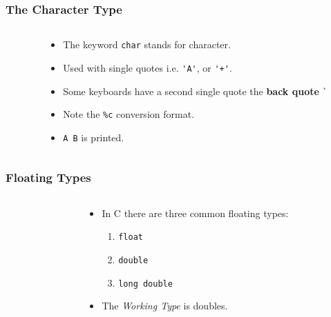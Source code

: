\begin{frame}[fragile]
\frametitle{The Character Type}

\begin{columns}
\begin{column}{0.65\textwidth}

\end{column}

\begin{column}{0.35\textwidth}
\begin{itemize}[<+->]
\item The  keyword \verb+char+ stands for character.
\item Used with single quotes i.e.
\verb^'A'^, or \verb^'+'^.
\item Some keyboards have a second single quote the {\bf back quote} \verb^`^
\item Note the \verb+%c+ conversion format.
\item \verb^A B^ is printed.
\end{itemize}
\end{column}

\end{columns}
\end{frame}


\begin{frame}[fragile]
\frametitle{Floating Types}
\begin{columns}
\begin{column}{0.65\textwidth}

\end{column}

\begin{column}{0.35\textwidth}
\begin{itemize}[<+->]
\item In C there are three common floating types:
    \begin{enumerate}[<+->]
        \item \verb+float+
        \item \verb+double+
        \item \verb+long double+
    \end{enumerate}
\item The {\it Working Type} is doubles.
\end{itemize}
\end{column}

\end{columns}
\end{frame}


